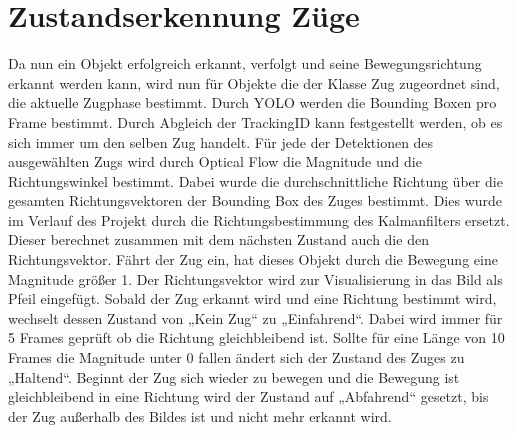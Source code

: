 \documentclass[conference]{IEEEtran}
\begin{document}
	\section{Zustandserkennung Züge}
	Da nun ein Objekt erfolgreich erkannt, verfolgt und seine Bewegungsrichtung erkannt werden kann, wird nun für Objekte die der Klasse Zug zugeordnet sind, die aktuelle Zugphase bestimmt.  
	Durch YOLO werden die Bounding Boxen pro Frame bestimmt. Durch Abgleich der TrackingID kann festgestellt werden, ob es sich immer um den selben Zug handelt. Für jede der Detektionen des ausgewählten Zugs wird durch Optical Flow die Magnitude und die Richtungswinkel bestimmt. Dabei wurde die durchschnittliche Richtung über die gesamten Richtungsvektoren der Bounding Box des Zuges bestimmt. Dies wurde im Verlauf des Projekt durch die Richtungsbestimmung des Kalmanfilters ersetzt. Dieser berechnet zusammen mit dem nächsten Zustand auch die den Richtungsvektor. Fährt der Zug ein, hat dieses Objekt durch die Bewegung eine Magnitude größer 1. Der Richtungsvektor wird zur Visualisierung in das Bild als Pfeil eingefügt. Sobald der Zug erkannt wird und eine Richtung bestimmt wird, wechselt dessen Zustand von „Kein Zug“ zu „Einfahrend“. Dabei wird immer für 5 Frames geprüft ob die Richtung gleichbleibend ist. Sollte für eine Länge von 10 Frames die Magnitude unter 0 fallen ändert sich der Zustand des Zuges zu „Haltend“. Beginnt der Zug sich wieder zu bewegen und die Bewegung ist gleichbleibend in eine Richtung wird der Zustand auf „Abfahrend“ gesetzt, bis der Zug außerhalb des Bildes ist und nicht mehr erkannt wird.
	
	
	
\end{document}
